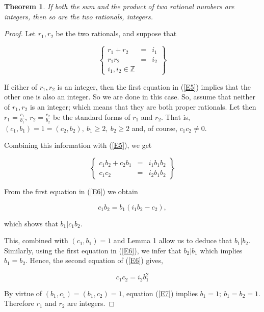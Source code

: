 \documentclass[12pt]{article}
\newtheorem{theorem}{Theorem}
\begin{document}
\begin{theorem} If both the sum and the product of two rational numbers are 
integers, then so are the two rationals, integers.
\end{theorem}

\begin{proof} Let $r_1,r_2$ be the two rationals, and suppose that 

\begin{equation} \left\{\begin{array}{rcl} r_1+r_2 & = & i_1\\
r_1r_2 & = & i_2\\
i_1,i_2 \in {\mathbb Z} \end{array}\right\} \label{E5}
\end{equation}

\noindent If either of $r_1,r_2$ is an integer, then the first equation in
(\ref{E5}) implies that the other one is also an integer.  
So  we are done in this case.  So, assume that neither of $r_1,r_2$ is an
integer; which means that they are both proper rationals.  Let then $r_1 =
\frac{c_1}{b_1},\ r_2 = \frac{c_2}{b_2}$ be the standard forms of $r_1$ and
$r_2$.  That is, $(c_1,b_1) = 1 = (c_2,b_2),\ b_1 \geq 2,\ b_2 \geq 2$ and, of
course, $c_1c_2 \neq 0$.

Combining this information with (\ref{E5}), we get 

\begin{equation} \left\{ \begin{array}{rcl} c_1b_2 + c_2b_1 & = & i_1 b_1b_2\\
c_1c_2 & = & i_2b_1b_2 \end{array}\right\} \label{E6}
\end{equation}

From the first equation in (\ref{E6}) we obtain

$$c_1b_2 = b_1(i_1b_2-c_2),
$$

\noindent which shows that $b_1|c_1b_2$.

This, combined with $(c_1,b_1)=1$ and Lemma 1 allow us to deduce that
$b_1|b_2$.  Similarly, using the first equation in (\ref{E6}), we infer that
$b_2|b_1$ which implies $b_1=b_2$.  Hence, the second equation of (\ref{E6})
gives,

\begin{equation}
c_1c_2 = i_2 b_1^2 \label{E7}
\end{equation}

By virtue of $(b_1,c_1)=(b_1,c_2) = 1$, equation (\ref{E7}) implies $b_1=1;\
b_1=b_2 = 1$.  Therefore $r_1$ and $r_2$ are integers.  \end{proof}
\end{document}
